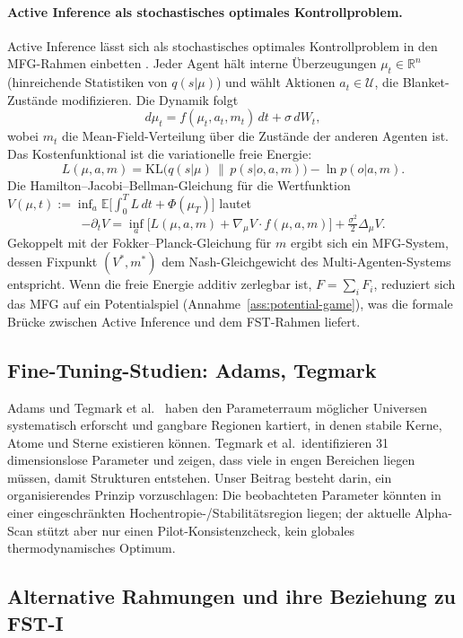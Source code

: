 \documentclass[12pt,a4paper]{article}
\theoremstyle{remark}
\begin{document}
\paragraph{Active Inference als stochastisches optimales Kontrollproblem.}
Active Inference l\"asst sich als stochastisches optimales Kontrollproblem in den MFG-Rahmen einbetten \citep{LasryLions2006,LasryLions2007}. Jeder Agent h\"alt interne \"Uberzeugungen $\mu_t \in \mathbb{R}^n$ (hinreichende Statistiken von $q(s|\mu)$) und w\"ahlt Aktionen $a_t \in \mathcal{U}$, die Blanket-Zust\"ande modifizieren. Die Dynamik folgt
\[
  d\mu_t = f(\mu_t, a_t, m_t)\,dt + \sigma\,dW_t,
\]
wobei $m_t$ die Mean-Field-Verteilung \"uber die Zust\"ande der anderen Agenten ist. Das Kostenfunktional ist die variationelle freie Energie:
\[
  L(\mu, a, m) = \mathrm{KL}\bigl(q(s|\mu) \,\|\, p(s|o,a,m)\bigr) - \ln p(o|a,m).
\]
Die Hamilton--Jacobi--Bellman-Gleichung f\"ur die Wertfunktion $V(\mu,t) := \inf_{a} \mathbb{E}\bigl[\int_0^T L\,dt + \Phi(\mu_T)\bigr]$ lautet
\[
  -\partial_t V = \inf_a\bigl[L(\mu,a,m) + \nabla_\mu V \cdot f(\mu,a,m)\bigr] + \tfrac{\sigma^2}{2}\Delta_\mu V.
\]
Gekoppelt mit der Fokker--Planck-Gleichung f\"ur $m$ ergibt sich ein MFG-System, dessen Fixpunkt $(V^*, m^*)$ dem Nash-Gleichgewicht des Multi-Agenten-Systems entspricht. Wenn die freie Energie additiv zerlegbar ist, $F = \sum_i F_i$, reduziert sich das MFG auf ein Potentialspiel (Annahme~\ref{ass:potential-game}), was die formale Br\"ucke zwischen Active Inference und dem FST-Rahmen liefert.

\subsection{Fine-Tuning-Studien: Adams, Tegmark}

Adams \citep{Adams2019} und Tegmark et al.\ \citep{Tegmark2006} haben den Parameterraum m\"oglicher Universen systematisch erforscht und gangbare Regionen kartiert, in denen stabile Kerne, Atome und Sterne existieren k\"onnen. Tegmark et al.\ identifizieren 31 dimensionslose Parameter und zeigen, dass viele in engen Bereichen liegen m\"ussen, damit Strukturen entstehen. Unser Beitrag besteht darin, ein organisierendes Prinzip vorzuschlagen: Die beobachteten Parameter k\"onnten in einer eingeschr\"ankten Hochentropie-/Stabilit\"atsregion liegen; der aktuelle Alpha-Scan st\"utzt aber nur einen Pilot-Konsistenzcheck, kein globales thermodynamisches Optimum.

\subsection{Alternative Rahmungen und ihre Beziehung zu FST-I}
\end{document}
